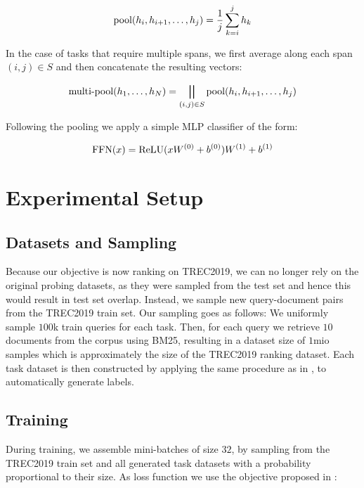 \begin{equation}
    \text{pool}(h_i, h_{i+1},\dots, h_j)= \frac{1}{j} \sum_{k=i}^j h_k
\end{equation}

In the case of tasks that require multiple spans, we first average along each span $(i,j) \in S$ and then concatenate the resulting vectors:

\begin{equation}
    \text{multi-pool}(h_1, \dots, h_N) = \bigparallel_{(i, j) \in S}{\text{pool}(h_i, h_{i+1},\dots, h_j)}
\end{equation}

Following the pooling we apply a simple MLP classifier of the form:

\begin{equation}
    \text{FFN}(x) = \text{ReLU}(x W^{(0)} + b^{(0)}) W^{(1)} + b^{(1)}
\end{equation}


\section{Experimental Setup}
\subsection{Datasets and Sampling}
Because our objective is now ranking on TREC2019, we can no longer rely on the original probing datasets, as they were sampled from the test set and hence this would result in test set overlap. Instead, we sample new query-document pairs from the TREC2019 train set. Our sampling goes as follows: We uniformly sample $100$k train queries for each task. Then, for each query we retrieve $10$ documents from the corpus using BM25, resulting in a dataset size of $1$mio samples which is approximately the size of the TREC2019 ranking dataset. Each task dataset is then constructed by applying the same procedure as in , to automatically generate labels.


\subsection{Training}
During training, we assemble mini-batches of size $32$, by sampling from the TREC2019 train set and all generated task datasets with a probability proportional to their size. As loss function we use the objective proposed in \cite{aghajanyan-etal-2021-muppet}:

